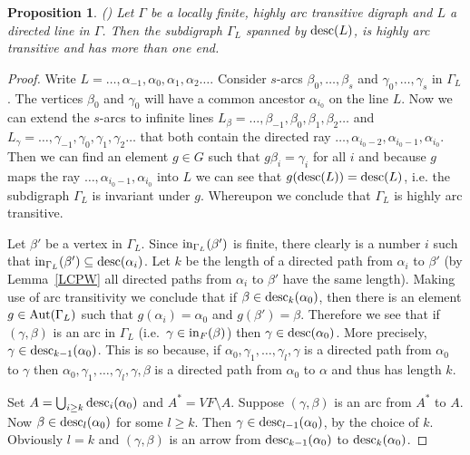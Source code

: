 \documentclass{emsprocart}
\newtheorem{proposition}[theorem]{Proposition}
\theoremstyle{definition}
\begin{document}
\begin{proposition}  {\rm (\cite[Lemma~3]{Moller2002a})}
Let $\Gamma$ be a locally finite, highly arc transitive digraph and
$L$ a directed line in $\Gamma$.  Then the subdigraph $\Gamma_L$
spanned by
${\mbox{${\rm desc}$}}(L)$, is highly arc transitive and has more than one end.
\end{proposition}

\begin{proof}  Write $L=\ldots, \alpha_{-1}, \alpha_0, \alpha_1,
\alpha_2\ldots$.  Consider $s$-arcs $\beta_0,\ldots, \beta_s$ and
$\gamma_0,\ldots, \gamma_s$ in $\Gamma_L$.
The vertices $\beta_0$ and $\gamma_0$
will have a common ancestor $\alpha_{i_0}$ on the line $L$.   Now we can
extend the $s$-arcs to infinite lines $L_\beta=\ldots, \beta_{-1},
\beta_0, \beta_1, \beta_2\ldots$ and $L_\gamma=\ldots, \gamma_{-1},
\gamma_0, \gamma_1, \gamma_2\ldots$ that both contain the directed ray
$\ldots, \alpha_{i_0-2},\alpha_{i_0-1}, \alpha_{i_0}$.
Then we can find an element
$g\in G$ such that $g\beta_i=\gamma_i$ for all $i$ and because $g$
maps the ray $\ldots, \alpha_{i_0-1}, \alpha_{i_0}$ into $L$ we can
see that $g({\mbox{${\rm desc}$}}(L))={\mbox{${\rm desc}$}}(L)$, i.e. the subdigraph $\Gamma_L$ is
invariant under $g$.  Whereupon we conclude that $\Gamma_L$ is highly
arc transitive.

Let $\beta'$ be a vertex in $\Gamma_L$.  Since ${\mbox{${\rm in}$}}_{\Gamma_L}(\beta')$ is
finite, there
clearly is a number $i$ such that ${\mbox{${\rm in}$}}_{\Gamma_L}(\beta')
\subseteq{\mbox{${\rm desc}$}}(\alpha_i)$.  Let $k$ be the length of a directed path
from $\alpha_i$ to $\beta'$ (by Lemma~\ref{LCPW}
all directed paths from $\alpha_i$ to $\beta'$ have the same length).
  Making use
of arc transitivity we conclude that
if $\beta\in{\mbox{${\rm desc}$}}_k(\alpha_0)$, then there is an element
$g\in{\mbox{${\rm Aut}$}}(\Gamma_L)$ such that
$g(\alpha_i)=\alpha_0$ and $g(\beta')=\beta$.
Therefore we see that if  $(\gamma,\beta)$ is an
arc in $\Gamma_L$ (i.e.\ $\gamma\in{\mbox{${\rm in}$}}_F(\beta)$)
then $\gamma\in {\mbox{${\rm desc}$}}(\alpha_0)$.  More precisely,
$\gamma\in {\mbox{${\rm desc}$}}_{k-1}({\alpha_0})$.  This is so because, if
$\alpha_0,\gamma_1,\ldots,\gamma_l,\gamma$
is a directed path from $\alpha_0$ to
$\gamma$ then $\alpha_0,\gamma_1,\ldots,\gamma_l,\gamma,\beta$ is a
directed path from $\alpha_0$ to $\alpha$ and thus has length $k$.

Set $A=\bigcup_{i\geq k}{\mbox{${\rm desc}$}}_i(\alpha_0)$ and $A^*=VF\setminus A$.  Suppose
$(\gamma,\beta)$ is an arc from $A^*$ to $A$.
Now $\beta\in{\mbox{${\rm desc}$}}_l(\alpha_0)$ for some
$l\geq k$.  Then $\gamma\in {\mbox{${\rm desc}$}}_{l-1}(\alpha_0)$, by  the choice of $k$.
Obviously $l=k$ and $(\gamma,\beta)$
is an arrow from ${\mbox{${\rm desc}$}}_{k-1}(\alpha_0)$ to ${\mbox{${\rm desc}$}}_{k}(\alpha_0)$.


\end{proof}
\end{document}
